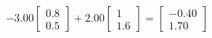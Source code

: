\documentclass[preview]{standalone}
\begin{document}
\begin{align*}
-3.00 \begin{bmatrix} 0.8 \\ 0.5 \end{bmatrix} + 2.00 \begin{bmatrix} 1 \\ 1.6 \end{bmatrix} = \begin{bmatrix} -0.40 \\ 1.70 \end{bmatrix}
\end{align*}
\end{document}
